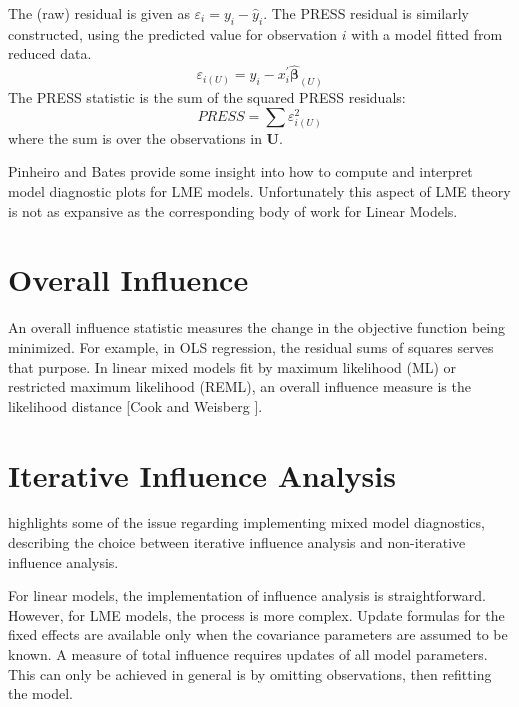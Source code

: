 \documentclass[12pt, a4paper]{report}
\theoremstyle{plain}
\theoremstyle{definition}
\theoremstyle{remark}
\begin{document}
The (raw) residual is given as $\varepsilon_i = y_i - \hat{y}_i$. The PRESS residual is
similarly constructed, using the predicted value for observation $i$ with a model fitted from reduced data.
\[ \varepsilon_{i(U)} = y_i - x^{\prime}_i \boldsymbol{\hat{\beta}}_{(U)} \]
The PRESS statistic is the sum of the squared PRESS residuals:
\[ PRESS = \sum \varepsilon^2_{i(U)} \]
where the sum is over the observations in $\boldsymbol{U}$.




Pinheiro and Bates provide some insight into how to compute and interpret model diagnostic plots for LME models. Unfortunately this aspect of LME theory is not as expansive as the corresponding body of work for Linear Models.


\section{Overall Influence}
An overall influence statistic measures the change in the objective function being minimized. For example, in
OLS regression, the residual sums of squares serves that purpose. In linear mixed models fit by
 maximum likelihood (ML) or  restricted maximum likelihood (REML), an overall influence measure is the  likelihood distance [Cook and Weisberg ].


\section{Iterative Influence Analysis}

\citet{schabenberger} highlights some of the issue regarding implementing mixed model diagnostics, describing  the choice between  iterative influence analysis and  non-iterative influence analysis.

For linear models, the implementation of influence analysis is straightforward. However, for LME models, the process is more complex. Update formulas for the fixed effects are available only when the covariance parameters are assumed to be known. A measure of total influence requires updates of all model parameters. This can only be achieved in general is by omitting observations, then refitting the model.

\end{document}
